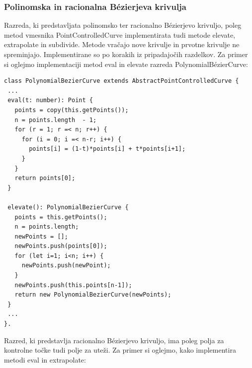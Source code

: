 \documentclass[isrm2, tisk]{fmfdelo}
\begin{document}
    \subsubsection*{Polinomska in racionalna Bézierjeva krivulja}
    Razreda, ki predstavljata polinomsko ter racionalno Bézierjevo krivuljo, poleg metod vmesnika PointControlledCurve implementirata tudi metode elevate, extrapolate in subdivide.
%
    Metode vračajo nove krivulje in prvotne krivulje ne spreminjajo.
    Implementirane so po korakih iz pripadajočih razdelkov.
    Za primer si oglejmo implementaciji metod eval in elevate razreda PolynomialBézierCurve:
    \begin{lstlisting}[label={lst:bez-curve}]
class PolynomialBezierCurve extends AbstractPointControlledCurve {
 ...
 eval(t: number): Point {
   points = copy(this.getPoints());
   n = points.length  - 1;
   for (r = 1; r =< n; r++) {
     for (i = 0; i =< n-r; i++) {
       points[i] = (1-t)*points[i] + t*points[i+1];
     }
   }
   return points[0];
 }

 elevate(): PolynomialBezierCurve {
   points = this.getPoints();
   n = points.length;
   newPoints = [];
   newPoints.push(points[0]);
   for (let i=1; i<n; i++) {
     newPoints.push(newPoint);
   }
   newPoints.push(this.points[n-1]);
   return new PolynomialBezierCurve(newPoints);
 }
 ...
}.
    \end{lstlisting}
    Razred, ki predstavlja racionalno Bézierjevo krivuljo, ima poleg polja za kontrolne točke tudi polje za uteži.
    Za primer si oglejmo, kako implementira metodi eval in extrapolate:
\end{document}
